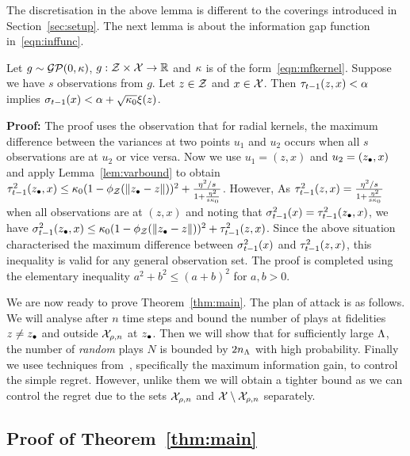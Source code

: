 The discretisation in the above lemma is different to the coverings introduced
in Section~\ref{sec:setup}.
The next lemma is about the information gap function in~\eqref{eqn:inffunc}.

\begin{lemma}
\label{lem:inffuncbound}
Let $g\sim\mathcal{G}\mathcal{P}(0,\kappa)$, $g:\mathcal{Z}\times\mathcal{X}\rightarrow\mathbb{R}$ and $\kappa$ is
of the form~\eqref{eqn:mfkernel}.
Suppose we have $s$ observations from $g$.
Let $z\in\mathcal{Z}$ and $x\in\mathcal{X}$.
Then $\tau_{t-1}(z,x) < \alpha$ implies $\sigma_{t-1}(x) < \alpha + \sqrt{\kappa_0}\xi(z)$.
\end{lemma}
\textbf{Proof:}
The proof uses the observation that for radial kernels, the maximum difference
between the variances at two points $u_1$ and $u_2$ occurs when all $s$ observations
are at $u_2$ or vice versa.
Now we use $u_1 = (z,x)$ and $u_2 = (z_{\bullet},x)$ and apply Lemma~\ref{lem:varbound}
to obtain $\tau^2_{t-1}(z_{\bullet},x) \leq \kappa_0(1-\phi_{\mathcal{Z}}(\|z_{\bullet}-z\|))^2 +
\frac{\eta^2/s}{1 + \frac{\eta^2}{s\kappa_0}}$.
However, As $\tau^2_{t-1}(z,x) = \frac{\eta^2/s}{1 + \frac{\eta^2}{s\kappa_0}}$
when all observations are at $(z,x)$ and noting that
$\sigma^2_{t-1}(x) = \tau^2_{t-1}(z_{\bullet},x) $, we have
$\sigma^2_{t-1}(z_{\bullet},x) \leq \kappa_0(1-\phi_{\mathcal{Z}}(\|z_{\bullet}-z\|))^2 + \tau^2_{t-1}(z,x)$.
Since the above situation characterised the maximum difference between
$\sigma^2_{t-1}(x)$ and $\tau^2_{t-1}(z,x)$, this inequality is valid for any general
observation set.
The proof is completed using the elementary inequality $a^2 + b^2 \leq (a+b)^2$ for $a,b>0$.
\hfill\BlackBox


We are now ready to prove Theorem~\ref{thm:main}.
The plan of attack is as follows.
We will analyse \bocas after $n$ time steps and bound the number of plays at fidelities
$z\neq z_{\bullet}$ and outside $\mathcal{X}_{\rho,n}$ at $z_{\bullet}$.
Then we will show that for sufficiently large $\Lambda$, the number of \emph{random}
plays $N$ is bounded by $2n_\Lambda$ with high probability.
Finally we usee techniques from~\citet{srinivas10gpbandits}, specifically the
maximum information gain, to control the simple regret.
However, unlike them we will obtain a tighter bound as we can control the regret due
to the sets $\mathcal{X}_{\rho,n}$ and $\mathcal{X}\setminus\mathcal{X}_{\rho,n}$ separately.


\subsection{\textbf{Proof of Theorem~\ref{thm:main}}}
\label{sec:mainproof}


